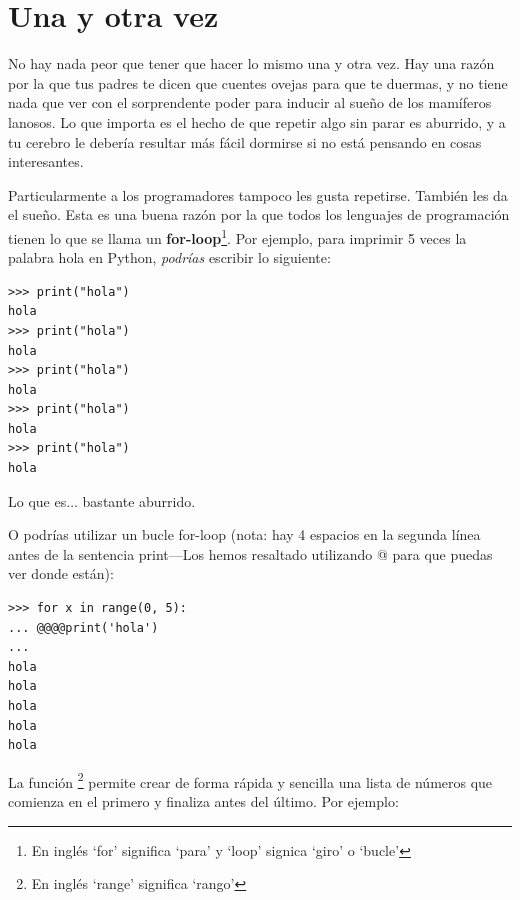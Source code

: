 

\chapter{Una y otra vez}\label{ch:againandagain}

No hay nada peor que tener que hacer lo mismo una y otra vez.  Hay una razón por la que tus padres te dicen que cuentes ovejas para que te duermas, y no tiene nada que ver con el sorprendente poder para inducir al sueño de los mamíferos lanosos. Lo que importa es el hecho de que repetir algo sin parar es aburrido, y a tu cerebro le debería resultar más fácil dormirse si no está pensando en cosas interesantes.
\par
Particularmente a los programadores tampoco les gusta repetirse. También les da el sueño.  Esta es una buena razón por la que todos los lenguajes de programación tienen lo que se llama un \textbf{for-loop}\footnote{En inglés `for' significa `para' y `loop' signica `giro' o `bucle'}. Por ejemplo, para imprimir 5 veces la palabra hola en Python, \emph{podrías} escribir lo siguiente:

\begin{listing}
\begin{verbatim}
>>> print("hola")
hola
>>> print("hola")
hola
>>> print("hola")
hola
>>> print("hola")
hola
>>> print("hola")
hola
\end{verbatim}
\end{listing}

Lo que es$\ldots$ bastante aburrido.

O podrías utilizar un bucle for-loop (nota: hay 4 espacios en la segunda línea antes de la sentencia print---Los hemos resaltado utilizando @ para que puedas ver donde están):

\begin{listingignore}
\begin{verbatim}
>>> for x in range(0, 5):
... @@@@print('hola')
... 
hola
hola
hola
hola
hola
\end{verbatim}
\end{listingignore}

La función \footnote{En inglés `range' significa `rango'} permite crear de forma rápida y sencilla una lista de números que comienza en el primero y finaliza antes del último. Por ejemplo:

